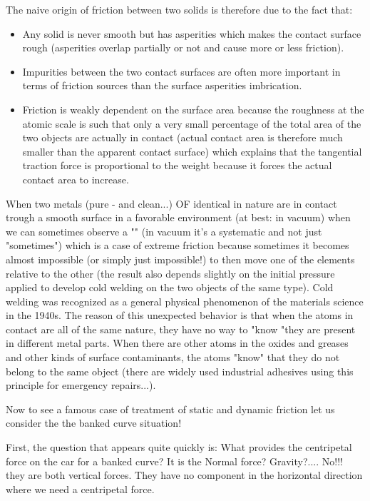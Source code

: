 	The naive origin of friction between two solids is therefore due to the fact that:
	\begin{itemize}
		\item Any solid is never smooth but has asperities which makes the contact surface rough (asperities overlap partially or not and cause more or less friction).

		\item Impurities between the two contact surfaces are often more important in terms of friction sources than the surface asperities imbrication.

		\item Friction is weakly dependent on the surface area because the roughness at the atomic scale is such that only a very small percentage of the total area of the two objects are actually in contact (actual contact area is therefore much smaller than the apparent contact surface) which explains that the tangential traction force is proportional to the weight because it forces the actual contact area to increase.
	\end{itemize}
	\begin{tcolorbox}[title=Remarks,colframe=black,arc=10pt]
	When two metals (pure - and clean...) OF identical in nature are in contact trough a smooth surface in a favorable environment (at best: in vacuum) when we can sometimes observe a "" (in vacuum it's a systematic and not just "sometimes") which is a case of extreme friction because sometimes it becomes almost impossible (or simply just impossible!) to then move one of the elements relative to the other (the result also depends slightly on the initial pressure applied to develop cold welding on the two objects of the same type). Cold welding was recognized as a general physical phenomenon of the materials science in the 1940s. The reason of this unexpected behavior is that when the atoms in contact are all of the same nature, they have no way to "know "they are present in different metal parts. When there are other atoms in the oxides and greases and other kinds of surface contaminants, the atoms "know" that they do not belong to the same object (there are widely used industrial adhesives using this principle for emergency repairs...).
	\end{tcolorbox}
	
	\pagebreak
	Now to see a famous case of treatment of static and dynamic friction let us consider the the banked curve situation!
	
    First, the question that appears quite quickly is: What provides the centripetal force on the car for a banked curve? It is the Normal force? Gravity?.... No!!! they are both vertical forces. They have no component in the horizontal direction where we need a centripetal force. 

